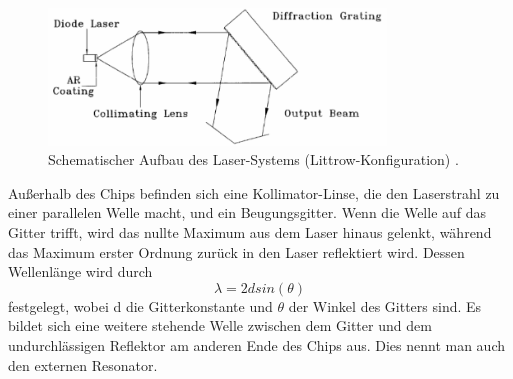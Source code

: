 \begin{figure}
    \centering
    \includegraphics[width=0.8\textwidth]{LittrowSetup.png}
    \caption{Schematischer Aufbau des Laser-Systems (Littrow-Konfiguration) \cite{ap60}.}
    \label{fig:Littrow}
\end{figure}
Außerhalb des Chips befinden sich eine Kollimator-Linse, die den Laserstrahl zu einer 
parallelen Welle macht, und ein Beugungsgitter. Wenn die Welle auf das Gitter trifft, wird 
das nullte Maximum aus dem Laser hinaus gelenkt, während das Maximum erster Ordnung zurück in den 
Laser reflektiert wird. Dessen Wellenlänge wird durch 
\begin{equation*}
    \lambda = 2dsin(\theta)
\end{equation*}
festgelegt, wobei d die Gitterkonstante und $\theta$ der Winkel des Gitters sind. Es bildet sich 
eine weitere stehende Welle zwischen dem Gitter und dem undurchlässigen Reflektor am anderen Ende des 
Chips aus. Dies nennt man auch den externen Resonator.

